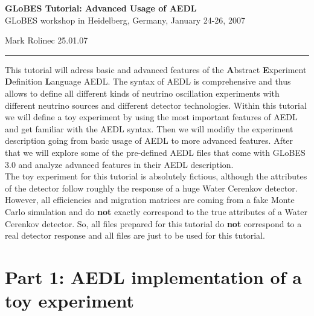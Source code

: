 \documentclass[12pt,a4paper]{article}
\theoremstyle{dotless}
\begin{document}
\vspace*{-3cm}
\begin{center}
{\large\bf GLoBES Tutorial: Advanced Usage of AEDL}\\ [0.3cm]
GLoBES workshop in Heidelberg, Germany, January 24-26, 2007
\end{center}
\vspace*{2mm}

Mark Rolinec \hfill 25.01.07

\bigskip
\hrule
\vspace*{4mm}

{\small
This tutorial will adress basic and advanced features of the {\bf A}bstract 
{\bf E}xperiment {\bf D}efinition {\bf L}anguage AEDL. The syntax of AEDL is
comprehensive and thus allows to define all different kinds of neutrino 
oscillation experiments with different neutrino sources and different detector
technologies. Within this tutorial we will define a toy experiment by using 
the most important features of AEDL and get familiar with the AEDL syntax.
Then we will modifiy the experiment description going from basic usage of AEDL
to more advanced features. After that we will explore some of the pre-defined
AEDL files that come with GLoBES 3.0 and analyze advanced features in their AEDL
description. \\

The toy experiment for this tutorial is absolutely fictious, although the attributes 
of the detector follow roughly the response of a huge Water Cerenkov detector.
However, all efficiencies and migration matrices are coming from a fake 
Monte Carlo simulation and do {\bf not} exactly correspond to the true 
attributes of a Water Cerenkov detector. So, all files prepared for this tutorial 
do {\bf not} correspond to a real detector response and all files are just to 
be used for this tutorial.  
}


\section*{Part 1: AEDL implementation of a toy experiment}
\end{document}
